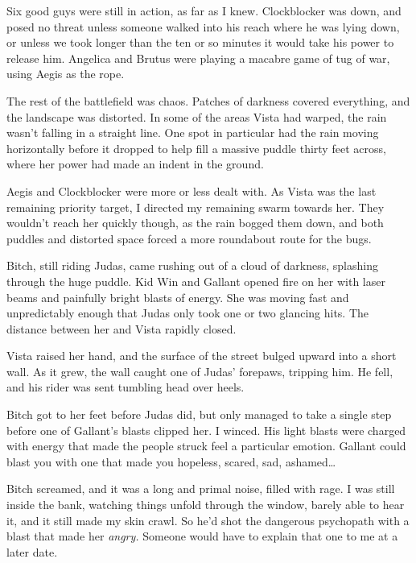 





Six good guys were still in action, as far as I knew.  Clockblocker was down, and posed no threat unless someone walked into his reach where he was lying down, or unless we took longer than the ten or so minutes it would take his power to release him.  Angelica and Brutus were playing a macabre game of tug of war, using Aegis as the rope.



The rest of the battlefield was chaos.  Patches of darkness covered everything, and the landscape was distorted.  In some of the areas Vista had warped, the rain wasn't falling in a straight line.  One spot in particular had the rain moving horizontally before it dropped to help fill a massive puddle thirty feet across, where her power had made an indent in the ground.



Aegis and Clockblocker were more or less dealt with.  As Vista was the last remaining priority target,  I directed my remaining swarm towards her.  They wouldn't reach her quickly though, as the rain bogged them down, and both puddles and distorted space forced a more roundabout route for the bugs.



Bitch, still riding Judas, came rushing out of a cloud of darkness, splashing through the huge puddle.  Kid Win and Gallant opened fire on her with laser beams and painfully bright blasts of energy.  She was moving fast and unpredictably enough that Judas only took one or two glancing hits.  The distance between her and Vista rapidly closed.



Vista raised her hand, and the surface of the street bulged upward into a short wall.  As it grew, the wall caught one of Judas' forepaws, tripping him.  He fell, and his rider was sent tumbling head over heels.



Bitch got to her feet before Judas did, but only managed to take a single step before one of Gallant's blasts clipped her.  I winced.  His light blasts were charged with energy that made the people struck feel a particular emotion.  Gallant could blast you with one that made you hopeless, scared, sad, ashamed\ldots



Bitch screamed, and it was a long and primal noise, filled with rage.  I was still inside the bank, watching things unfold through the window, barely able to hear it, and it still made my skin crawl.  So he'd shot the dangerous psychopath with a blast that made her \emph{angry.  }Someone would have to explain that one to me at a later date.



